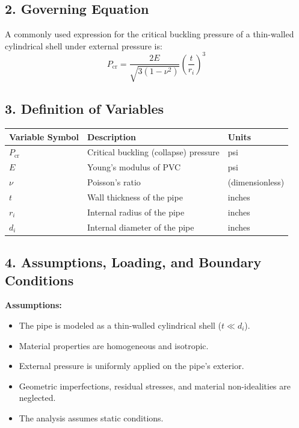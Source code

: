 \documentclass[12pt]{article}
\begin{document}
\subsection*{2. Governing Equation}
A commonly used expression for the critical buckling pressure of a thin-walled cylindrical shell under external pressure is:
\begin{equation}
    P_{\text{cr}} = \frac{2E}{\sqrt{3(1-\nu^2)}} \left(\frac{t}{r_i}\right)^3
    \tag{1}
\end{equation}

\subsection*{3. Definition of Variables}

\begin{center}
\begin{tabular}{|>{\raggedright}p{2cm}|>{\raggedright}p{6cm}|>{\raggedright\arraybackslash}p{3cm}|}
\hline
\textbf{Variable Symbol} & \textbf{Description} & \textbf{Units} \\
\hline
\(P_{\text{cr}}\) & Critical buckling (collapse) pressure & psi \\
\hline
\(E\) & Young's modulus of PVC & psi \\
\hline
\(\nu\) & Poisson's ratio & (dimensionless) \\
\hline
\(t\) & Wall thickness of the pipe & inches \\
\hline
\(r_i\) & Internal radius of the pipe & inches \\
\hline
\(d_i\) & Internal diameter of the pipe & inches \\
\hline
\end{tabular}
\end{center}

\subsection*{4. Assumptions, Loading, and Boundary Conditions}
\textbf{Assumptions:}
\begin{itemize}
    \item The pipe is modeled as a thin-walled cylindrical shell (\(t \ll d_i\)).
    \item Material properties are homogeneous and isotropic.
    \item External pressure is uniformly applied on the pipe's exterior.
    \item Geometric imperfections, residual stresses, and material non-idealities are neglected.
    \item The analysis assumes static conditions.
\end{itemize}
\end{document}
